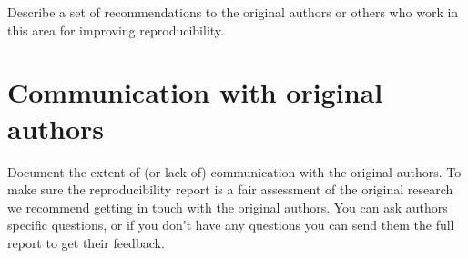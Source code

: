 \documentclass[11pt,a4paper]{article}
\begin{document}
Describe a set of recommendations to the original authors or others who work in this area for improving reproducibility.

\section{Communication with original authors}
Document the extent of (or lack of) communication with the original authors. To make sure the reproducibility report is a fair assessment of the original research we recommend getting in touch with the original authors. You can ask authors specific questions, or if you don't have any questions you can send them the full report to get their feedback.





\end{document}
